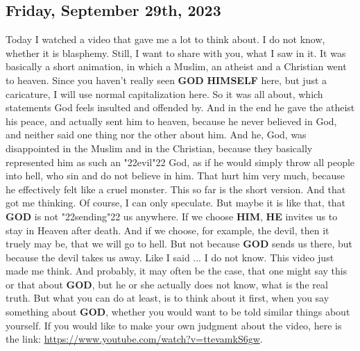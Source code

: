 \documentclass[12pt,a4paper]{article}
\newcommand{\God}[0]{\textbf{GOD}}
\newcommand{\He}[0]{\textbf{HE}}
\newcommand{\Him}[0]{\textbf{HIM}}
\newcommand{\Himself}[0]{\textbf{HIMSELF}}
\newcommand{\q}[1]{\char"22{#1}\char"22 }
\begin{document}
	\subsection{Friday, September 29th, 2023}
		Today I watched a video that gave me a lot to think about.
		I do not know,
		whether it is blasphemy.
		Still,
		I want to share with you,
		what I saw in it.
		It was basically a short animation,
		in which a Muslim,
		an atheist and a Christian went to heaven.
		Since you haven't really seen {\God} {\Himself} here,
		but just a caricature,
		I will use normal capitalization here.
		So it was all about,
		which statements God feels insulted and offended by.
		And in the end he gave the atheist his peace,
		and actually sent him to heaven,
		because he never believed in God,
		and neither said one thing nor the other about him.
		And he, God, was disappointed in the Muslim and in the Christian,
		because they basically represented him as such an \q{evil} God,
		as if he would simply throw all people into hell,
		who sin and do not believe in him.
		That hurt him very much,
		because he effectively felt like a cruel monster.
		This so far is the short version.
		And that got me thinking.
		Of course,
		I can only speculate.
		But maybe it is like that,
		that {\God} is not \q{sending} us anywhere.
		If we choose {\Him},
		{\He} invites us to stay in Heaven after death.
		And if we choose, for example, the devil,
		then it truely may be,
		that we will go to hell.
		But not because {\God} sends us there,
		but because the devil takes us away.
		Like I said ... I do not know.
		This video just made me think.
		And probably,
		it may often be the case,
		that one might say this or that about {\God},
		but he or she actually does not know,
		what is the real truth.
		But what you can do at least,
		is to think about it first,
		when you say something about {\God},
		whether you would want to be told similar things about yourself.
		If you would like to make your own judgment about the video,
		here is the link: \url{https://www.youtube.com/watch?v=ttevamkS6gw}.
\end{document}
